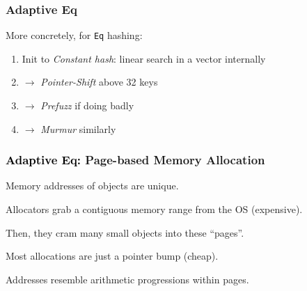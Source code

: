 \documentclass[onlytextwidth,usepdftitle=false]{beamer}
\newcommand\inlinett[1]{\texttt{\fontsize{10pt}{12pt}\selectfont #1}}
\newcommand\Adaptive{Ad\hspace{-0.06em}aptive}
\newcommand*\lisp[1]{\inlinett{#1}}
\newcommand\mglconclusion[1]{\textcolor{mglred2}{\textbf{\maltese} #1}}
\newcommand\lispersonly[1]{}
\begin{document}
\begin{frame}
\frametitle{\Adaptive{} Eq}
More concretely, for \lisp{Eq} hashing:
{
\setlength{\parskip}{0pt}
\begin{enumerate}
\item Init to \emph{Constant hash}: linear search in a vector internally \lispersonly{(no extra overhead for keys moved by GC)}
\item $\rightarrow$ \emph{Pointer-Shift} above 32 keys
\item $\rightarrow$ \emph{Prefuzz} if doing badly
\item $\rightarrow$ \emph{Murmur} similarly
\end{enumerate}
\vspace{-4\baselineskip}
\hspace{15em}%
\vspace{-5\baselineskip}
}
\end{frame}

\begin{frame}[fragile]
\frametitle{\textcolor{black}{\Adaptive{} Eq:} Page-based Memory Allocation}
Memory addresses of objects are unique.

Allocators grab a contiguous memory range from the OS (expensive).

Then, they cram many small objects into these ``pages''.

Most allocations are just a pointer bump (cheap).

\mglconclusion{Addresses resemble arithmetic progressions within pages.}
\end{frame}
\end{document}

